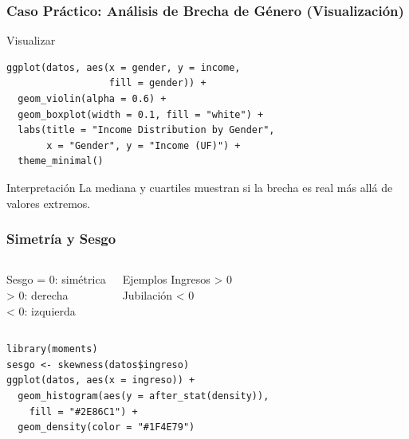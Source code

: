 \documentclass[aspectratio=169,11pt]{beamer}
\begin{document}
\begin{frame}[fragile]
\frametitle{Caso Práctico: Análisis de Brecha de Género (Visualización)}

\begin{exampleblock}{Visualizar}
  \begin{lstlisting}[basicstyle=\ttfamily\tiny]
ggplot(datos, aes(x = gender, y = income,
                  fill = gender)) +
  geom_violin(alpha = 0.6) +
  geom_boxplot(width = 0.1, fill = "white") +
  labs(title = "Income Distribution by Gender",
       x = "Gender", y = "Income (UF)") +
  theme_minimal()
  \end{lstlisting}
\end{exampleblock}

\pause

\begin{alertblock}{Interpretación}
  La mediana y cuartiles muestran si la brecha es real más allá de valores extremos.
\end{alertblock}
\end{frame}

\begin{frame}[fragile]
\frametitle{Simetría y Sesgo}
\tiny

\begin{columns}[T]
  \begin{block}{Sesgo}
    = 0: simétrica \\
    > 0: derecha \\
    < 0: izquierda
  \end{block}

  \begin{block}{Ejemplos}
    Ingresos > 0 \\
    Jubilación < 0
  \end{block}
\end{columns}

\vspace{-0.1cm}
\pause

\begin{lstlisting}[basicstyle=\ttfamily\tiny]
library(moments)
sesgo <- skewness(datos$ingreso)
ggplot(datos, aes(x = ingreso)) +
  geom_histogram(aes(y = after_stat(density)),
    fill = "#2E86C1") +
  geom_density(color = "#1F4E79")
\end{lstlisting}
\end{frame}
\end{document}
